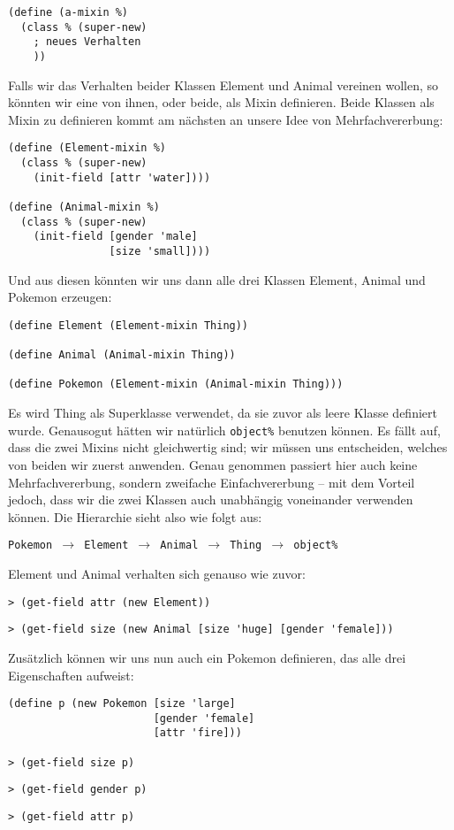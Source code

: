 \begin{lstlisting}
(define (a-mixin %)
  (class % (super-new)
    ; neues Verhalten
    ))
\end{lstlisting}

Falls wir das Verhalten beider Klassen Element und Animal vereinen wollen, so könnten wir eine von ihnen, oder beide, als Mixin definieren. Beide Klassen als Mixin zu definieren kommt am nächsten an unsere Idee von Mehrfachvererbung:

\begin{lstlisting}
(define (Element-mixin %)
  (class % (super-new)
    (init-field [attr 'water])))

(define (Animal-mixin %)
  (class % (super-new)
    (init-field [gender 'male]
                [size 'small])))
\end{lstlisting}

Und aus diesen könnten wir uns dann alle drei Klassen Element, Animal und Pokemon erzeugen:
\begin{lstlisting}
(define Element (Element-mixin Thing))

(define Animal (Animal-mixin Thing))
 
(define Pokemon (Element-mixin (Animal-mixin Thing)))
\end{lstlisting}

Es wird Thing als Superklasse verwendet, da sie zuvor als leere Klasse definiert wurde. Genausogut hätten wir natürlich \texttt{object\%} benutzen können. Es fällt auf, dass die zwei Mixins nicht gleichwertig sind; wir müssen uns entscheiden, welches von beiden wir zuerst anwenden. Genau genommen passiert hier auch keine Mehrfachvererbung, sondern zweifache Einfachvererbung -- mit dem Vorteil jedoch, dass wir die zwei Klassen auch unabhängig voneinander verwenden können. Die Hierarchie sieht also wie folgt aus:

\texttt{Pokemon $\rightarrow$ Element $\rightarrow$ Animal $\rightarrow$ Thing $\rightarrow$ object\%}

Element und Animal verhalten sich genauso wie zuvor:

\begin{lstlisting}
> (get-field attr (new Element))
\end{lstlisting} 
{}

\begin{lstlisting}
> (get-field size (new Animal [size 'huge] [gender 'female]))
\end{lstlisting} 
{}

Zusätzlich können wir uns nun auch ein Pokemon definieren, das alle drei Eigenschaften aufweist:
\begin{lstlisting}
(define p (new Pokemon [size 'large]
                       [gender 'female]
                       [attr 'fire]))
 
> (get-field size p)
\end{lstlisting}
{}
\begin{lstlisting}
> (get-field gender p)
\end{lstlisting}
{}
\begin{lstlisting}
> (get-field attr p)
\end{lstlisting}
{}


